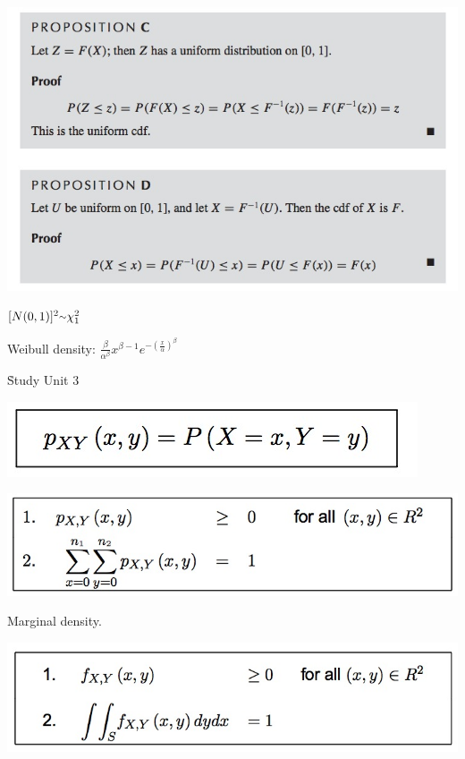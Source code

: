 \documentclass{examnotes}
\begin{document}
{\includegraphics[scale=0.6]{./img/2fun2.jpg}

$[N(0,1)]^2\mytilde \chi^2_1$

Weibull density: $\displaystyle\frac{\beta}{\alpha^\beta}x^{\beta-1}e^{-\left(\displaystyle\frac{x}{\alpha}\right)^\beta}$

\h{Study Unit 3}


\includegraphics[scale=0.4]{./img/3jd1.jpg}

\includegraphics[scale=0.4]{./img/3jd2.jpg}


Marginal density.

\includegraphics[scale=0.4]{./img/3con1.jpg}                                         

}
\end{document}
